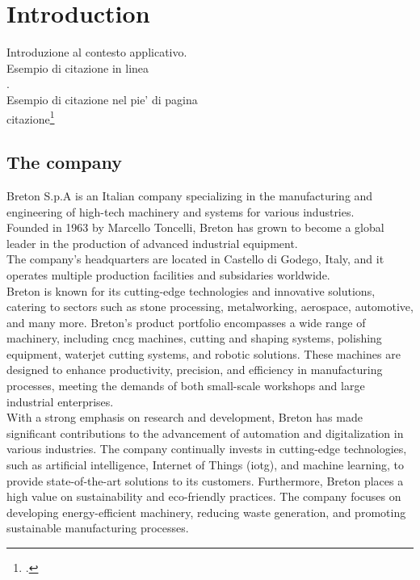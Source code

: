 \chapter{Introduction}
\label{cap:Introduction}

Introduzione al contesto applicativo.\\

\noindent Esempio di citazione in linea \\
\cite{site:agile-manifesto}. \\

\noindent Esempio di citazione nel pie' di pagina \\
citazione\footcite{womak:lean-thinking} \\

\section{The company}

Breton S.p.A is an Italian company specializing in the manufacturing and engineering of high-tech machinery and systems for various industries. \\
Founded in 1963 by Marcello Toncelli, Breton has grown to become a global leader in the production of advanced industrial equipment. \\
The company's headquarters are located in Castello di Godego, Italy, 
and it operates multiple production facilities and subsidaries worldwide.\\
Breton is known for its cutting-edge technologies and innovative solutions, catering to sectors such as stone processing, metalworking, aerospace, automotive, and many more.
Breton's product portfolio encompasses a wide range of machinery, including \gls{cncg} machines, cutting and shaping systems, polishing equipment, waterjet cutting systems, and robotic solutions. These machines are designed to enhance productivity, precision, and efficiency in manufacturing processes, meeting the demands of both small-scale workshops and large industrial enterprises.\\
With a strong emphasis on research and development, Breton has made significant contributions to the advancement of automation and digitalization in various industries. The company continually invests in cutting-edge technologies, such as artificial intelligence, Internet of Things (\gls{iotg}), and machine learning, to provide state-of-the-art solutions to its customers.
Furthermore, Breton places a high value on sustainability and eco-friendly practices. The company focuses on developing energy-efficient machinery, reducing waste generation, and promoting sustainable manufacturing processes.
